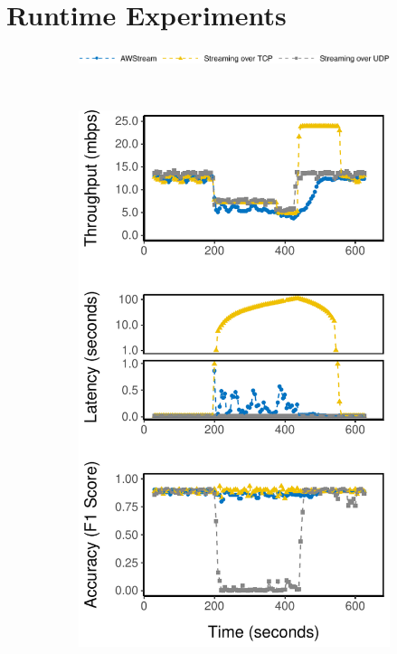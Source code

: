 \section{Runtime Experiments}
\begin{figure}
  \begin{subfigure}{\linewidth}
    \centering
    \includegraphics[width=0.5\columnwidth]{figures/runtime-legend.pdf}
  \end{subfigure}
  \\
  \vspace{0.4em}
  \begin{subfigure}{0.3\textwidth}
    \centering
    \includegraphics[width=\textwidth]{figures/runtime-mot-verticle.pdf}

\end{subfigure}
\end{figure}
